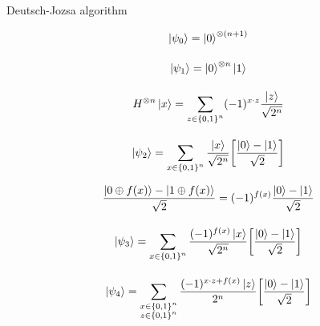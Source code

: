 \documentclass[9pt, handout, aspectratio=169]{beamer}	%
\begin{document}
\begin{frame}[allowframebreaks]{Deutsch-Jozsa algorithm}
\begin{multicols}{2}
		\begin{gather*}
		  \ket{\psi_0} = \ket{0}^{\otimes \qty(n+1)} \\[10pt]
		  \ket{\psi_1} = \ket{0}^{\otimes n} \ket{1} \\[10pt]
			H^{\otimes n} \ket{x} =
		    \sum_{z \in \qty{0,1}^n} (-1)^{x \cdot z}
				\frac{\ket{z}}{\sqrt{2^n}} \\[10pt]
			\ket{\psi_2} =
		    \sum_{x \in \qty{0,1}^n} \frac{\ket{x}}{\sqrt{2^n}}
		    \qty[\frac{\ket{0}-\ket{1}}{\sqrt{2}}]
		\end{gather*}

		\columnbreak

		\begin{gather*}
		  \frac{\ket{0 \oplus f(x)}-\ket{1 \oplus f(x)}}{\sqrt{2}} =
		    (-1)^{f(x)} \frac{\ket{0}-\ket{1}}{\sqrt{2}} \\[10pt]
			\ket{\psi_3} =
		    \sum_{x \in \qty{0,1}^n} \frac{(-1)^{f(x)} \ket{x}}{\sqrt{2^n}}
		    \qty[\frac{\ket{0}-\ket{1}}{\sqrt{2}}] \\[10pt]
			\ket{\psi_4} =
		    \sum_{\substack{x \in \qty{0,1}^n \\ z \in \qty{0,1}^n}}
		    \frac{(-1)^{x \cdot z +f(x)} \ket{z}}{2^n}
		    \qty[\frac{\ket{0}-\ket{1}}{\sqrt{2}}]
		\end{gather*}

	\end{multicols}

\end{frame}

\end{document}
